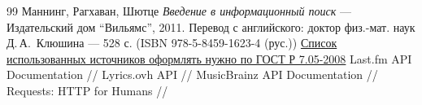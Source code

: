 \begin{thebibliography}{99}
Маннинг, Рагхаван, Шютце
{\itshape Введение в информационный поиск} --- Издательский дом \enquote{Вильямс}, 2011. Перевод с английского: доктор физ.-мат. наук Д.\,А.\, Клюшина --- 528 с. (ISBN 978-5-8459-1623-4 (рус.))
\href{http://www.ifap.ru/library/gost/7052008.pdf}{Список использованных источников оформлять нужно по  ГОСТ Р 7.05-2008}
Last.fm API Documentation // 
Lyrics.ovh API // 
MusicBrainz API Documentation // 
Requests: HTTP for Humans // 
\end{thebibliography}
\pagebreak
